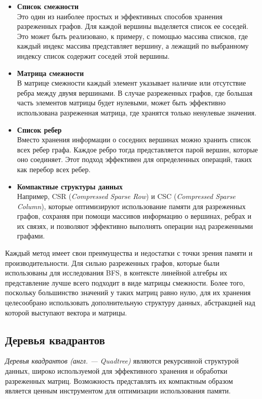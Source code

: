 \begin{itemize}
	\item{\textbf{Список смежности}} \\
	Это один из наиболее простых и эффективных способов хранения разреженных графов. Для каждой вершины выделяется список ее соседей. Это может быть реализовано, к примеру, с помощью массива списков, где каждый индекс массива представляет вершину, а лежащий по выбранному индексу список содержит соседей этой вершины.
    \item{\textbf{Матрица смежности}} \\ 
    В матрице смежности каждый элемент указывает наличие или отсутствие ребра между двумя вершинами. В случае разреженных графов, где большая часть элементов матрицы будет нулевыми, может быть эффективно использована разреженная матрица, где хранятся только ненулевые значения.
    \item{\textbf{Список ребер}} \\ 
    Вместо хранения информации о соседних вершинах можно хранить список всех ребер графа. Каждое ребро тогда представляется парой вершин, которые оно соединяет. Этот подход эффективен для определенных операций, таких как перебор всех ребер.
    \item{\textbf{Компактные структуры данных}} \\
    Например, CSR (\textit{Compressed Sparse Row}) и CSC (\textit{Compressed Sparse Column}), которые оптимизируют использование памяти для разреженных графов, сохраняя при помощи массивов информацию о вершинах, ребрах и их связях, и позволяют эффективно выполнять операции над разреженными графами.
\end{itemize}

\noindent Каждый метод имеет свои преимущества и недостатки с точки зрения памяти и производительности. Для сильно разреженных графов, которые были использованы для исследования BFS, в контексте линейной алгебры их представление лучше всего подходит в виде матрицы смежности. Более того, поскольку большинство значений у таких матриц равно нулю, для их хранения целесообрано использовать дополнительную структуру данных, абстракцией над которой выступают вектора и матрицы.



\subsection{Деревья квадрантов}
\noindent \textit{Деревья квадрантов (англ. --- Quadtree)} являются рекурсивной структурой данных, широко используемой для эффективного хранения и обработки разреженных матриц. Возможность представлять их компактным образом является ценным инструментом для оптимизации использования памяти.

